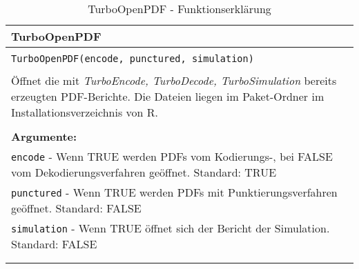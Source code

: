 \begin{longtable}{|p{\textwidth}|}
\hline
\rowcolor{lightblue}TurboOpenPDF\\
\hline
\\
\texttt{TurboOpenPDF(encode, punctured, simulation)}\\
\\
Öffnet die mit \emph{TurboEncode, TurboDecode, TurboSimulation} bereits erzeugten PDF-Berichte. Die Dateien liegen im Paket-Ordner im Installationsverzeichnis von R.\\
\\
\textbf{Argumente:}\\
\texttt{encode} - Wenn TRUE werden PDFs vom Kodierungs-, bei FALSE vom Dekodierungsverfahren geöffnet. Standard: TRUE\\
\texttt{punctured} - Wenn TRUE werden PDFs mit Punktierungsverfahren geöffnet. Standard: FALSE\\
\texttt{simulation} - Wenn TRUE öffnet sich der Bericht der Simulation. Standard: FALSE\\
\\
\hline
\caption{TurboOpenPDF - Funktionserklärung}
\end{longtable}
